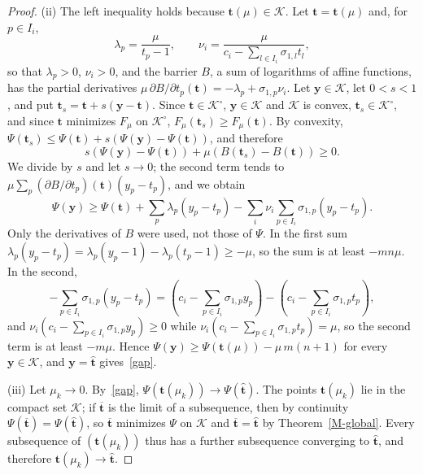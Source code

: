 \documentclass[11pt]{article}
\theoremstyle{plain}
\theoremstyle{remark}
\numberwithin{equation}{section}
\begin{document}
\begin{proof}
(ii) The left inequality holds because $\bm t(\mu)\in\mathcal{K}$. Let
$\bm t=\bm t(\mu)$ and, for $p\in I_i$,
\begin{equation}
\lambda_p=\frac{\mu}{t_p-1},\qquad
\nu_i=\frac{\mu}{c_i-\sum_{l\in I_i}\sigma_{1,l}t_l} ,
\end{equation}
so that $\lambda_p>0$, $\nu_i>0$, and the barrier $B$, a sum of logarithms of
affine functions, has the partial derivatives
$\mu\,\partial B/\partial t_p(\bm t)=-\lambda_p+\sigma_{1,p}\nu_i$.
Let $\bm y\in\mathcal{K}$, let $0<s<1$, and put $\bm t_s=\bm t+s(\bm y-\bm t)$.
Since $\bm t\in\mathcal{K}^\circ$, $\bm y\in\mathcal{K}$ and $\mathcal{K}$ is
convex, $\bm t_s\in\mathcal{K}^\circ$, and since $\bm t$ minimizes $F_\mu$
on $\mathcal{K}^\circ$, $F_\mu(\bm t_s)\ge F_\mu(\bm t)$. By convexity,
$\Psi(\bm t_s)\le\Psi(\bm t)+s\left(\Psi(\bm y)-\Psi(\bm t)\right)$, and therefore
\begin{equation}
s\left(\Psi(\bm y)-\Psi(\bm t)\right)+\mu\left(B(\bm t_s)-B(\bm t)\right)\ge 0 .
\end{equation}
We divide by $s$ and let $s\to 0$; the second term tends to
$\mu\sum_p\left(\partial B/\partial t_p\right)(\bm t)\left(y_p-t_p\right)$, and we obtain
\begin{equation}\label{barrier-stationary}
\Psi(\bm y)\ge\Psi(\bm t)
+\sum_{p}\lambda_p\left(y_p-t_p\right)
-\sum_{i}\nu_i\sum_{p\in I_i}\sigma_{1,p}\left(y_p-t_p\right).
\end{equation}
Only the derivatives of $B$ were used, not those of $\Psi$.
In the first sum
$\lambda_p\left(y_p-t_p\right)=\lambda_p\left(y_p-1\right)-\lambda_p\left(t_p-1\right)\ge-\mu$,
so the sum is at least $-mn\mu$. In the second,
\begin{equation}
-\sum_{p\in I_i}\sigma_{1,p}\left(y_p-t_p\right)
=\left(c_i-\sum_{p\in I_i}\sigma_{1,p}y_p\right)-\left(c_i-\sum_{p\in I_i}\sigma_{1,p}t_p\right),
\end{equation}
and $\nu_i\left(c_i-\sum_{p\in I_i}\sigma_{1,p}y_p\right)\ge 0$ while
$\nu_i\left(c_i-\sum_{p\in I_i}\sigma_{1,p}t_p\right)=\mu$, so the second term is at least
$-m\mu$. Hence $\Psi(\bm y)\ge\Psi(\bm t(\mu))-\mu\,m(n+1)$
for every $\bm y\in\mathcal{K}$, and $\bm y=\widehat{\bm t}$ gives~\eqref{gap}.

(iii) Let $\mu_k\to 0$. By~\eqref{gap},
$\Psi\left(\bm t(\mu_k)\right)\to\Psi\left(\widehat{\bm t}\right)$.
The points $\bm t(\mu_k)$ lie in the compact set $\mathcal{K}$; if
$\overline{\bm t}$ is the limit of a subsequence, then by continuity
$\Psi(\overline{\bm t})=\Psi(\widehat{\bm t})$, so
$\overline{\bm t}$ minimizes $\Psi$ on $\mathcal{K}$ and $\overline{\bm t}=\widehat{\bm t}$
by Theorem~\ref{M-global}. Every subsequence of $\left(\bm t(\mu_k)\right)$ thus has a
further subsequence converging to $\widehat{\bm t}$, and therefore
$\bm t(\mu_k)\to\widehat{\bm t}$.
\end{proof}
\end{document}
